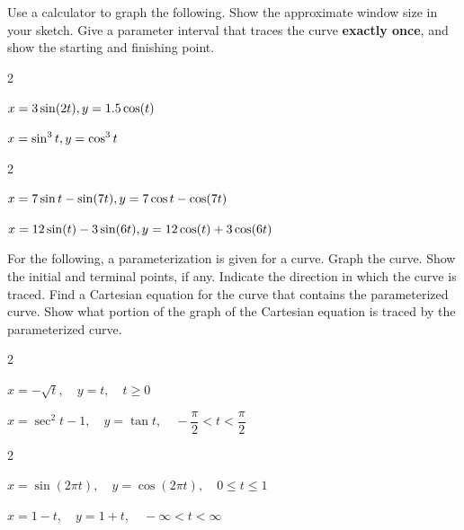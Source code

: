 \documentclass[11pt]{article}
\begin{document}
\noindent Use a calculator to graph the following. Show the approximate window size in your sketch. Give a parameter interval that traces the curve \textbf{exactly once}, and show the starting and finishing point.

    \begin{enumerate}

    \begin{multicols}{2}
        \item $\displaystyle x = 3\sin(2t),\quad \\y = 1.5\cos(t)$\\[1ex]\smallgraph
        \item $\displaystyle x = \sin^3 t,\quad \\y = \cos^3 t$\\[1ex]\smallgraph
    \end{multicols}

    \begin{multicols}{2}
        \item $\displaystyle x = 7\sin t - \sin(7t),\quad \\y = 7\cos t - \cos(7t)$\\[1ex]\smallgraph
        \item $\displaystyle x = 12\sin(t) - 3\sin(6t),\quad \\y = 12\cos(t) + 3\cos(6t)$\\[1ex]\smallgraph
    \end{multicols}

    \vspace{1ex}

    \noindent For the following, a parameterization is given for a curve. Graph the curve. Show the initial and terminal points, if any. Indicate the direction in which the curve is traced. Find a Cartesian equation for the curve that contains the parameterized curve. Show what portion of the graph of the Cartesian equation is traced by the parameterized curve.

    \begin{multicols}{2}
        \item $\displaystyle x = -\sqrt{t},\quad y = t,\quad t \ge 0$\\[1ex]\smallgraph
        \item $\displaystyle x = \sec^2 t - 1,\quad y = \tan t,\quad -\dfrac{\pi}{2} < t < \dfrac{\pi}{2}$\\[1ex]\smallgraph
    \end{multicols}

    \begin{multicols}{2}
        \item $\displaystyle x = \sin(2\pi t),\quad y = \cos(2\pi t),\quad 0 \le t \le 1$\\[1ex]\smallgraph
        \item $\displaystyle x = 1 - t,\quad y = 1 + t,\quad -\infty < t < \infty$\\[1ex]\smallgraph
    \end{multicols}


\end{enumerate}
\end{document}
